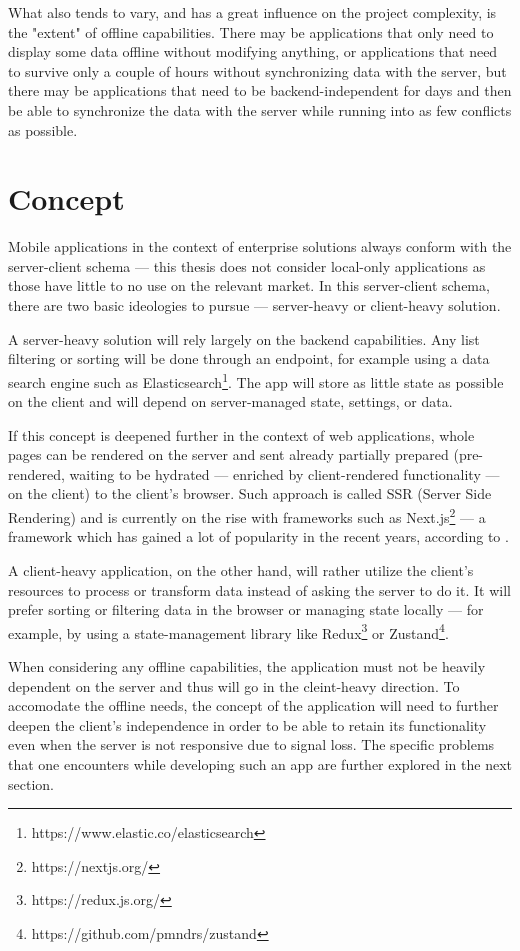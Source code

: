 \documentclass[
  digital,     %
  color,       %
  oneside,     %
  nosansbold,  %
  nocolorbold, %
  lof,         %
  lot,         %
]{fithesis4}
\begin{document}
What also tends to vary, and has a great influence on the project complexity, is the "extent" of offline capabilities. There may be applications that only need to display some data offline without modifying anything, or applications that need to survive only a couple of hours without synchronizing data with the server, but there may be applications that need to be backend-independent for days and then be able to synchronize the data with the server while running into as few conflicts as possible.
\section{Concept}
Mobile applications in the context of enterprise solutions always conform with the server-client schema --- this thesis does not consider local-only applications as those have little to no use on the relevant market. In this server-client schema, there are two basic ideologies to pursue --- server-heavy or client-heavy solution. 

A server-heavy solution will rely largely on the backend capabilities. Any list filtering or sorting will be done through an endpoint, for example using a data search engine such as Elasticsearch\footnote{https://www.elastic.co/elasticsearch}. The app will store as little state as possible on the client and will depend on server-managed state, settings, or data. 

If this concept is deepened further in the context of web applications, whole pages can be rendered on the server and sent already partially prepared (pre-rendered, waiting to be hydrated --- enriched by client-rendered functionality --- on the client) to the client's browser. Such approach is called SSR (Server Side Rendering) and is currently on the rise with frameworks such as Next.js\footnote{https://nextjs.org/} --- a framework which has gained a lot of popularity in the recent years, according to .

A client-heavy application, on the other hand, will rather utilize the client's resources to process or transform data instead of asking the server to do it. It will prefer sorting or filtering data in the browser or managing state locally --- for example, by using a state-management library like Redux\footnote{https://redux.js.org/} or Zustand\footnote{https://github.com/pmndrs/zustand}.

When considering any offline capabilities, the application must not be heavily dependent on the server and thus will go in the cleint-heavy direction. To accomodate the offline needs, the concept of the application will need to further deepen the client's independence in order to be able to retain its functionality even when the server is not responsive due to signal loss. The specific problems that one encounters while developing such an app are further explored in the next section.
\end{document}
